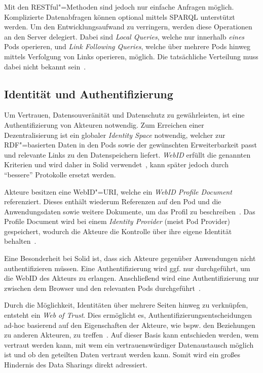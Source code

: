 Mit den RESTful"=Methoden sind jedoch nur einfache Anfragen möglich.
Komplizierte Datenabfragen können optional mittels SPARQL unterstützt werden.
Um den Entwicklungsaufwand zu verringern, werden diese Operationen an den Server delegiert.
Dabei sind \emph{Local Queries}, welche nur innerhalb \emph{eines} Pods operieren, und \emph{Link Following Queries}, welche über mehrere Pods hinweg mittels Verfolgung von Links operieren, möglich.
Die tatsächliche Verteilung muss dabei nicht bekannt sein~\cite{sambraSolidPlatformDecentralized2016}.


\subsection{Identität und Authentifizierung}

Um Vertrauen, Datensouveränität und Datenschutz zu gewährleisten, ist eine Authentifizierung von Akteuren notwendig.
Zum Erreichen einer Dezentralisierung ist ein globaler \emph{Identity Space} notwendig, welcher zur RDF"=basierten Daten in den Pods sowie der gewünschten Erweiterbarkeit passt und relevante Links zu den Datenspeichern liefert.
\emph{WebID} erfüllt die genannten Kriterien und wird daher in Solid verwendet~\cite{sambraSolidPlatformDecentralized2016}, kann später jedoch durch \enquote{bessere} Protokolle ersetzt werden.

Akteure besitzen eine WebID"=URI, welche ein \emph{WebID Profile Document} referenziert.
Dieses enthält wiederum Referenzen auf den Pod und die Anwendungsdaten sowie weitere Dokumente, um das Profil zu beschreiben~\cite{solidcommunitygroupSolidWebIDProfile2024}.
Das Profile Document wird bei einem \emph{Identity Provider} (meist Pod Provider) gespeichert, wodurch die Akteure die Kontrolle über ihre eigene Identität behalten~\cite{sambraSolidPlatformDecentralized2016}.

Eine Besonderheit bei Solid ist, dass sich Akteure gegenüber Anwendungen nicht authentifizieren müssen.
Eine Authentifizierung wird ggf. nur durchgeführt, um die WebID des Akteurs zu erlangen.
Anschließend wird eine Authentifizierung nur zwischen dem Browser und den relevanten Pods durchgeführt~\cite{sambraSolidPlatformDecentralized2016}.

Durch die Möglichkeit, Identitäten über mehrere Seiten hinweg zu verknüpfen, entsteht ein \emph{Web of Trust}.
Dies ermöglicht es, Authentifizierungsentscheidungen ad-hoc basierend auf den Eigenschaften der Akteure, wie bspw. den Beziehungen zu anderen Akteuren, zu treffen~\cite{sambraSolidPlatformDecentralized2016}.
Auf dieser Basis kann entschieden werden, wem vertraut werden kann, mit wem ein vertrauenswürdiger Datenaustausch möglich ist und ob den geteilten Daten vertraut werden kann.
Somit wird ein großes Hindernis des Data Sharings direkt adressiert.


